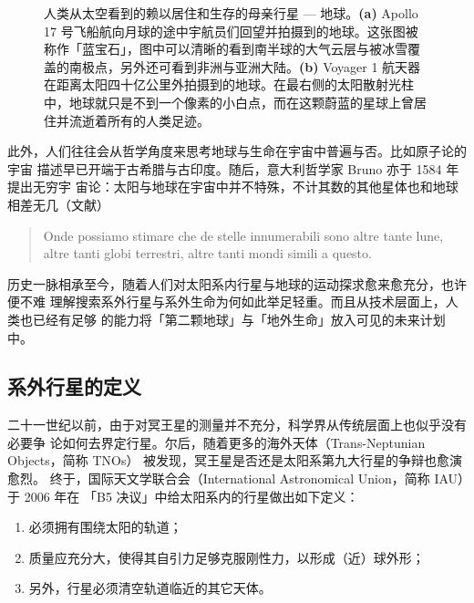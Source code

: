 {\begin{savenotes}
\begin{figure}[ht]
\begin{subfigure}[b]{.45\textwidth}
\label{fig:voyagerearth}
\addtocounter{footnote}{+1}
\end{subfigure}
\caption{人类从太空看到的赖以居住和生存的母亲行星 --- 地球。\textbf{(a)} Apollo 17 号飞船航向月球的途中宇航员们回望并拍摄到的地球。这张图被称作「蓝宝石」，图中可以清晰的看到南半球的大气云层与被冰雪覆盖的南极点，另外还可看到非洲与亚洲大陆。\textbf{(b)} Voyager 1 航天器在距离太阳四十亿公里外拍摄到的地球。在最右侧的太阳散射光柱中，地球就只是不到一个像素的小白点，而在这颗蔚蓝的星球上曾居住并流逝着所有的人类足迹。 }
\label{fig:rwalone} 
\end{figure}
\end{savenotes}
}

此外，人们往往会从哲学角度来思考地球与生命在宇宙中普遍与否。比如原子论的宇宙
描述早已开端于古希腊与古印度。随后，意大利哲学家 Bruno 亦于 1584 年提出无穷宇
宙论：太阳与地球在宇宙中并不特殊，不计其数的其他星体也和地球相差无几（文献）

\begin{quote}
Onde possiamo stimare che de stelle innumerabili sono altre tante lune, altre tanti globi terrestri, altre tanti mondi simili a questo.
\end{quote}

历史一脉相承至今，随着人们对太阳系内行星与地球的运动探求愈来愈充分，也许便不难
理解搜索系外行星与系外生命为何如此举足轻重。而且从技术层面上，人类也已经有足够
的能力将「第二颗地球」与「地外生命」放入可见的未来计划中\cite{WoolfAngel1998}。

\subsection{系外行星的定义}
    
二十一世纪以前，由于对冥王星的测量并不充分，科学界从传统层面上也似乎没有必要争
论如何去界定行星。尔后，随着更多的海外天体（Trans-Neptunian Objects，简称 TNOs）
被发现，冥王星是否还是太阳系第九大行星的争辩也愈演愈烈\cite{SternMitton2005}。
终于，国际天文学联合会（International Astronomical Union，简称 IAU）于 2006 年在
「B5 决议\footnotemark[3]」中给太阳系内的行星做出如下定义：
\setcounter{footnote}{3}

\begin{enumerate}[leftmargin=1\parindent]
\item 必须拥有围绕太阳的轨道；
\item 质量应充分大，使得其自引力足够克服刚性力，以形成（近）球外形；
\item 另外，行星必须清空轨道临近的其它天体。
\end{enumerate}

